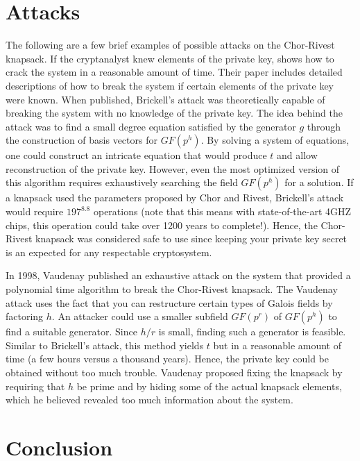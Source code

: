 \documentclass[12pt,a4paper,titlepage]{article}
\begin{document}
\section{Attacks}

The following are a few brief examples of possible attacks on the Chor-Rivest knapsack. If the cryptanalyst knew elements of the private key, \cite{Chor84:1} shows how to crack the system in a reasonable amount of time. Their paper includes detailed descriptions of how to break the system if certain elements of the private key were known. When published, Brickell's attack was theoretically capable of breaking the system with no knowledge of the private key. The idea behind the attack was to find a small degree equation satisfied by the generator $g$ through the construction of basis vectors for $GF(p^h)$. By solving a system of equations, one could construct an intricate equation that would produce $t$ and allow reconstruction of the private key. However, even the most optimized version of this algorithm requires exhaustively searching the field $GF(p^h)$ for a solution. If a knapsack used the parameters proposed by Chor and Rivest, Brickell's attack would require $197^{8.8}$ operations \cite{Chor84:1} (note that this means with state-of-the-art 4GHZ chips, this operation could take over 1200 years to complete!).  Hence, the Chor-Rivest knapsack was considered safe to use since keeping your private key secret is an expected for any respectable cryptosystem.\\

\par In 1998, Vaudenay \cite{breaking:5} published an exhaustive attack on the system that provided a polynomial time algorithm to break the Chor-Rivest knapsack. The Vaudenay attack uses the fact that you can restructure certain types of Galois fields by factoring $h$. An attacker could use a smaller subfield  $GF(p^r)$ of $GF(p^h)$ to find a suitable generator. Since $h/r$ is small, finding such a generator is feasible. Similar to Brickell's attack, this method yields $t$ but in a reasonable amount of time (a few hours versus a thousand years). Hence, the private key could be obtained without too much trouble. Vaudenay proposed fixing the knapsack by requiring that $h$ be prime and by hiding some of the actual knapsack elements, which he believed revealed too much information about the system.

\section{Conclusion}
\end{document}
